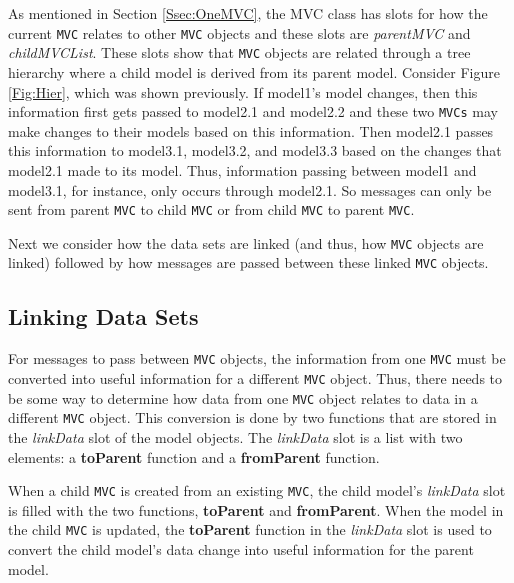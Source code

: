 \documentclass{article}[11pt]
\newcommand{\Rfunction}[1]{{\textbf{#1}}}
\newcommand{\Robject}[1]{{\texttt{#1}}}
\newcommand{\Rslot}[1]{\textsl{#1}}
\newcommand{\Rclass}[1]{\textsf{#1}}
\begin{document}
As mentioned in Section \ref{Ssec:OneMVC}, the \Rclass{MVC} class has slots
for how the current \Robject{MVC} relates to other \Robject{MVC} objects and
these slots are \Rslot{parentMVC} and \Rslot{childMVCList}.  These slots show
that \Robject{MVC} objects are related through a tree hierarchy where a child
model is derived from its parent model.  Consider Figure
\ref{Fig:Hier}, which was shown previously.  If model1's model changes, then
this information first gets passed to model2.1 and model2.2 and these two
\Robject{MVCs} may make changes to their models based on this
information.  Then model2.1 passes this information to model3.1, model3.2, and
model3.3 based on the changes that model2.1 made to its model.  Thus,
information passing between model1 and model3.1, for instance, only occurs
through model2.1.  So messages can only be sent from parent \Robject{MVC} to
child \Robject{MVC} or from child \Robject{MVC} to parent \Robject{MVC}. 

Next we consider how the data sets are linked (and thus, how \Robject{MVC}
objects are linked) followed by how messages are passed between these
linked \Robject{MVC} objects. 

\subsection{Linking Data Sets}\label{Ssec:MultLink}

For messages to pass between \Robject{MVC} objects, the information from one
\Robject{MVC} must be converted into useful information for a different
\Robject{MVC} object.  Thus, there needs to be some way to determine how data
from one \Robject{MVC} object relates to data in a different \Robject{MVC}
object.  This conversion is done by two functions that are stored in the
\Rslot{linkData} slot of the model objects.  The \Rslot{linkData}
slot is a list with two elements: a \Rfunction{toParent} function and a
\Rfunction{fromParent} function. 

When a child \Robject{MVC} is created from an existing \Robject{MVC}, the
child model's \Rslot{linkData} slot is filled with the two functions,
\Rfunction{toParent} and \Rfunction{fromParent}.  When the model in
the child \Robject{MVC} is updated, the \Rfunction{toParent} function in the
\Rslot{linkData} slot is used to convert the child model's data
change into useful information for the parent model.  
\end{document}
